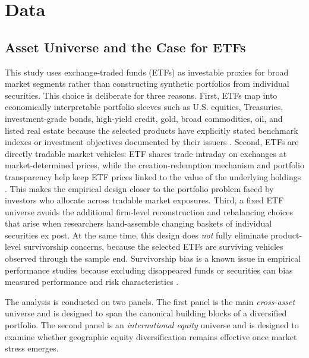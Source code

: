 
\section{Data}
\label{sec:data}

\subsection{Asset Universe and the Case for ETFs}
\label{subsec:asset_universe}

This study uses exchange-traded funds (ETFs) as investable proxies for broad market segments rather than constructing synthetic portfolios from individual securities.
This choice is deliberate for three reasons. First, ETFs map into economically interpretable portfolio sleeves such as U.S. equities, Treasuries,
investment-grade bonds, high-yield credit, gold, broad commodities, oil, and listed real estate because the selected products have explicitly stated benchmark indexes or investment
objectives documented by their issuers \citep{ssga_spy_2026,ishares_shy_2026,ishares_tlt_2026,ishares_agg_2026,ishares_hyg_2026,ssga_gld_2026,invesco_dbc_2026,uscf_uso_2026,vanguard_vnq_2026}.
Second, ETFs are directly tradable market vehicles: ETF shares trade intraday on exchanges at market-determined prices, while the creation-redemption mechanism and portfolio transparency help keep ETF
prices linked to the value of the underlying holdings \citep{ici_etf_faq_2026,madhavan2016exchange}. This makes the empirical design closer to the portfolio problem faced by investors who allocate across tradable market exposures.
Third, a fixed ETF universe avoids the additional firm-level reconstruction and rebalancing choices that arise when researchers hand-assemble changing baskets of individual securities ex post.
At the same time, this design does \emph{not} fully eliminate product-level survivorship concerns, because the selected ETFs are surviving vehicles observed through the sample end.
Survivorship bias is a known issue in empirical performance studies because excluding disappeared funds or securities can bias measured performance and risk characteristics \citep{brown1992survivorship,elton1996survivorship}.

The analysis is conducted on two panels. The first panel is the main \emph{cross-asset} universe and is designed to span the canonical building blocks of a diversified portfolio. The second panel is an \emph{international equity} universe and is designed to examine whether geographic equity diversification remains effective once market stress emerges.

